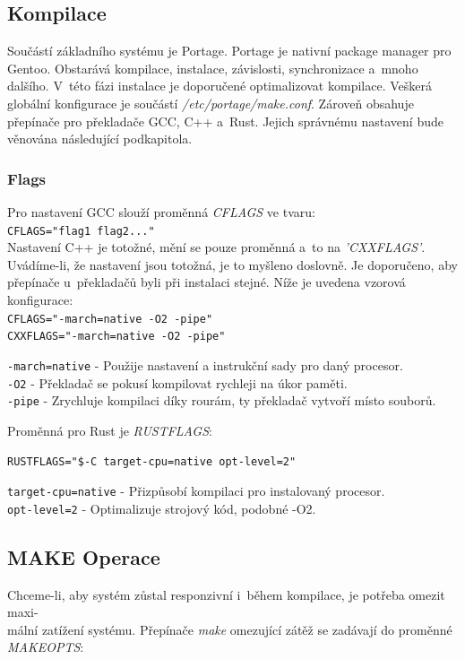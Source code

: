 \documentclass[12pt,a4paper,twoside,]{article}
\begin{document}
{{{{{{{\newpage
\subsection{\textsf{Kompilace}}
Součástí základního systému je Portage. Portage je nativní package manager pro Gentoo.
Obstarává kompilace, instalace, závislosti, synchronizace a~mnoho dalšího. V~této fázi instalace
je doporučené optimalizovat kompilace. Veškerá globální konfigurace je součástí \textit{/etc/portage/make.conf}.
Zároveň obsahuje přepínače pro překladače GCC, C++ a~Rust. Jejich správnému nastavení bude věnována následující podkapitola.

\subsubsection{\textsf{Flags}}
Pro nastavení GCC slouží proměnná \textit{CFLAGS} ve tvaru:\\ \hspace*{1.5em}\texttt{CFLAGS="flag1 flag2..."}\\Nastavení C++ je totožné, mění se pouze proměnná a~to na \textit{'CXXFLAGS'}.
Uvádíme-li, že nastavení jsou totožná, je to myšleno doslovně. Je doporučeno, aby přepínače u~překladačů byli při instalaci stejné. Níže je uvedena
vzorová konfigurace:\\
\hspace*{1.5em}\texttt{CFLAGS="-march=native -O2 -pipe"}\\
\hspace*{1.5em}\texttt{CXXFLAGS="-march=native -O2 -pipe"}

\hspace{-1.5em}\texttt{-march=native} - Použije nastavení a instrukční sady pro daný procesor.\\
\texttt{-O2} - Překladač se pokusí kompilovat rychleji na úkor paměti.\\
\texttt{-pipe} - Zrychluje kompilaci díky rourám, ty překladač vytvoří místo souborů.

\hspace{-1.5em}Proměnná pro Rust je \textit{RUSTFLAGS}:

\texttt{RUSTFLAGS="\$-C target-cpu=native opt-level=2"}

\hspace{-1.5em}\texttt{target-cpu=native} - Přizpůsobí kompilaci pro instalovaný procesor.\\
\texttt{opt-level=2} - Optimalizuje strojový kód, podobné -O2. %
\subsection{\textsf{MAKE Operace}}
Chceme-li, aby systém zůstal responzivní i~během kompilace, je potřeba omezit maxi-\\mální zatížení systému.
Přepínače \textit{make} omezující zátěž se zadávají do proměnné \textit{MAKEOPTS}:

}}}}}}}
\end{document}
